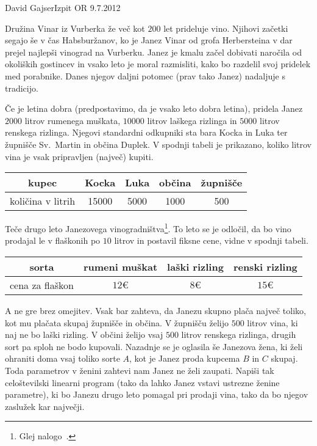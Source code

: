 \begin{naloga}{David Gajser}{Izpit OR 9.7.2012}
\begin{vprasanje}
Družina Vinar iz Vurberka že več kot $200$ let prideluje vino.
Njihovi začetki segajo še v čas Habsburžanov,
ko je Janez Vinar od grofa Herbersteina
v dar prejel najlepši vinograd na Vurberku.
Janez je kmalu začel dobivati naročila od okoliških gostincev
in vsako leto je moral razmisliti,
kako bo razdelil svoj pridelek med porabnike.
Danes njegov daljni potomec (prav tako Janez) nadaljuje s tradicijo.

Če je letina dobra (predpostavimo, da je vsako leto dobra letina),
pridela Janez $2000$ litrov rumenega muškata,
$10000$ litrov laškega rizlinga in $5000$ litrov renskega rizlinga.
Njegovi standardni odkupniki sta bara Kocka in Luka
ter župnišče Sv.~Martin in občina Duplek.
V spodnji tabeli je prikazano,
koliko litrov vina je vsak pripravljen (največ) kupiti.
\begin{center}
\begin{tabular}{c|cccc}
kupec & Kocka & Luka & občina & župnišče \\ \hline
količina v litrih & 15000 & 5000 & 1000 & 500
\end{tabular}
\end{center}
Teče drugo leto Janezovega vinogradništva\footnote{
Glej nalogo~.
}.
To leto se je odločil,
da bo vino prodajal le v flaškonih po $10$ litrov
in postavil fiksne cene, vidne v spodnji tabeli.
\begin{center}
\begin{tabular}{c|ccc}
sorta & rumeni muškat & laški rizling & renski rizling \\ \hline
cena za flaškon & $12 €$ & $8 €$ & $15 €$
\end{tabular}
\end{center}
A ne gre brez omejitev.
Vsak bar zahteva, da Janezu skupno plača največ toliko,
kot mu plačata skupaj župnišče in občina.
V župnišču želijo $500$ litrov vina, ki naj ne bo laški rizling.
V občini želijo vsaj $500$ litrov renskega rizlinga,
drugih sort pa sploh ne bodo kupovali.
Nazadnje se je oglasila še Janezova žena,
ki želi ohraniti doma vsaj toliko sorte $A$,
kot je Janez proda kupcema $B$ in $C$ skupaj.
Toda parametrov v ženini zahtevi nam Janez ne želi zaupati.
Napiši tak celoštevilski linearni program
(tako da lahko Janez vstavi ustrezne ženine parametre),
ki bo Janezu drugo leto pomagal pri prodaji vina,
tako da bo njegov zaslužek kar največji.
\end{vprasanje}
\begin{odgovor}
\end{odgovor}
\end{naloga}
